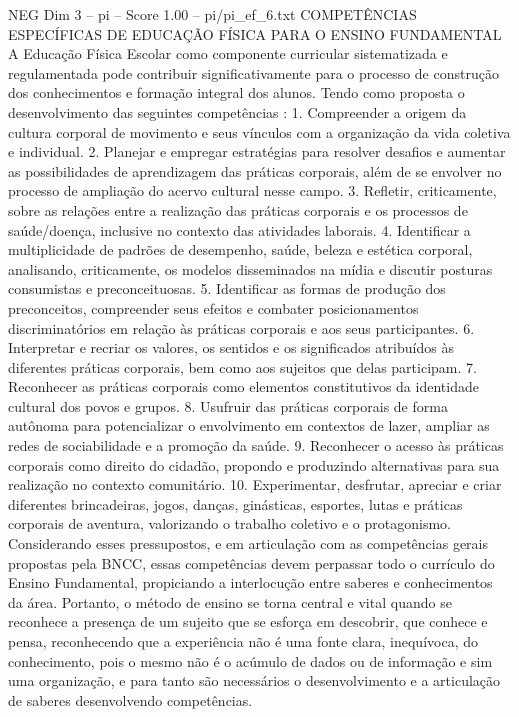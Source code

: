 \begin{textsample}{NEG Dim 3 – pi – Score 1.00 – pi/pi\_ef\_6.txt}  \label{ex:f3_neg_032}
COMPETÊNCIAS ESPECÍFICAS DE EDUCAÇÃO FÍSICA PARA O ENSINO FUNDAMENTAL A Educação Física Escolar como componente curricular sistematizada e regulamentada pode contribuir significativamente para o processo de construção dos conhecimentos e formação integral dos alunos.
Tendo como proposta o desenvolvimento das seguintes competências : 1.
Compreender a origem da cultura corporal de movimento e seus vínculos com a organização da vida coletiva e individual. 2.
Planejar e empregar estratégias para resolver desafios e aumentar as possibilidades de aprendizagem das práticas corporais, além de se envolver no processo de ampliação do acervo cultural nesse campo. 3.
Refletir, criticamente, sobre as relações entre a realização das práticas corporais e os processos de saúde/doença, inclusive no contexto das atividades laborais. 4.
Identificar a multiplicidade de padrões de desempenho, saúde, beleza e estética corporal, analisando, criticamente, os modelos disseminados na mídia e discutir posturas consumistas e preconceituosas. 5.
Identificar as formas de produção dos preconceitos, compreender seus efeitos e combater posicionamentos discriminatórios em relação às práticas corporais e aos seus participantes. 6.
Interpretar e recriar os valores, os sentidos e os significados atribuídos às diferentes práticas corporais, bem como aos sujeitos que delas participam. 7.
Reconhecer as práticas corporais como elementos constitutivos da identidade cultural dos povos e grupos. 8.
Usufruir das práticas corporais de forma autônoma para potencializar o envolvimento em contextos de lazer, ampliar as redes de sociabilidade e a promoção da saúde. 9.
Reconhecer o acesso às práticas corporais como direito do cidadão, propondo e produzindo alternativas para sua realização no contexto comunitário. 10.
Experimentar, desfrutar, apreciar e criar diferentes brincadeiras, jogos, danças, ginásticas, esportes, lutas e práticas corporais de aventura, valorizando o trabalho coletivo e o protagonismo.
Considerando esses pressupostos, e em articulação com as competências gerais propostas pela BNCC, essas competências devem perpassar todo o currículo do Ensino Fundamental, propiciando a interlocução entre saberes e conhecimentos da área.
Portanto, o método de ensino se torna central e vital quando se reconhece a presença de um sujeito que se esforça em descobrir, que conhece e pensa, reconhecendo que a experiência não é uma fonte clara, inequívoca, do conhecimento, pois o mesmo não é o acúmulo de dados ou de informação e sim uma organização, e para tanto são necessários o desenvolvimento e a articulação de saberes desenvolvendo competências.

\end{textsample}

